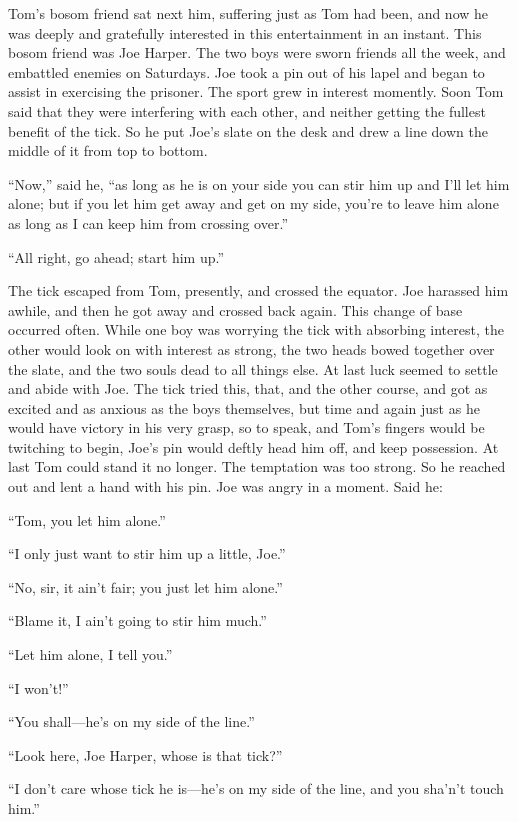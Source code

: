 \documentclass{book}
\begin{document}
Tom’s bosom friend sat next him, suffering just as Tom had been, and now he was deeply and gratefully interested in this entertainment in an instant. This bosom friend was Joe Harper. The two boys were sworn friends all the week, and embattled enemies on Saturdays. Joe took a pin out of his lapel and began to assist in exercising the prisoner. The sport grew in interest momently. Soon Tom said that they were interfering with each other, and neither getting the fullest benefit of the tick. So he put Joe’s slate on the desk and drew a line down the middle of it from top to bottom.

“Now,” said he, “as long as he is on your side you can stir him up and I’ll let him alone; but if you let him get away and get on my side, you’re to leave him alone as long as I can keep him from crossing over.”

“All right, go ahead; start him up.”

The tick escaped from Tom, presently, and crossed the equator. Joe harassed him awhile, and then he got away and crossed back again. This change of base occurred often. While one boy was worrying the tick with absorbing interest, the other would look on with interest as strong, the two heads bowed together over the slate, and the two souls dead to all things else. At last luck seemed to settle and abide with Joe. The tick tried this, that, and the other course, and got as excited and as anxious as the boys themselves, but time and again just as he would have victory in his very grasp, so to speak, and Tom’s fingers would be twitching to begin, Joe’s pin would deftly head him off, and keep possession. At last Tom could stand it no longer. The temptation was too strong. So he reached out and lent a hand with his pin. Joe was angry in a moment. Said he:

“Tom, you let him alone.”

“I only just want to stir him up a little, Joe.”

“No, sir, it ain’t fair; you just let him alone.”

“Blame it, I ain’t going to stir him much.”

“Let him alone, I tell you.”

“I won’t!”

“You shall—he’s on my side of the line.”

“Look here, Joe Harper, whose is that tick?”

“I don’t care whose tick he is—he’s on my side of the line, and you sha’n’t touch him.”
\end{document}
